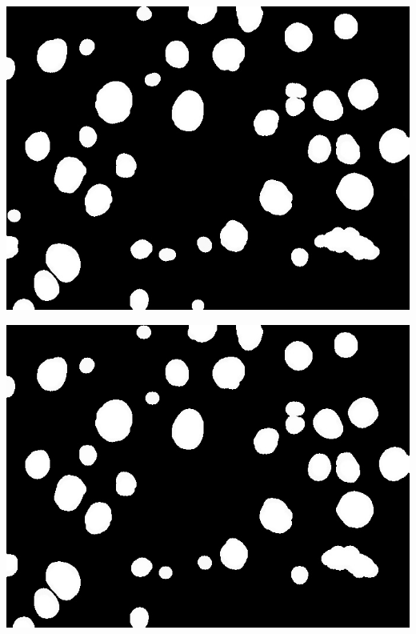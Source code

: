 \documentclass[a4paper]{article}
\begin{document}
\begin{minipage}{0.24\textwidth}
    \centering
    \includegraphics[width=\textwidth]{../code/task1/output/kernel_size_21.jpg}
\end{minipage}
\hfill
\begin{minipage}{0.24\textwidth}
    \centering
    \includegraphics[width=\textwidth]{../code/task1/output/kernel_size_23.jpg}
\end{minipage}
\end{document}
